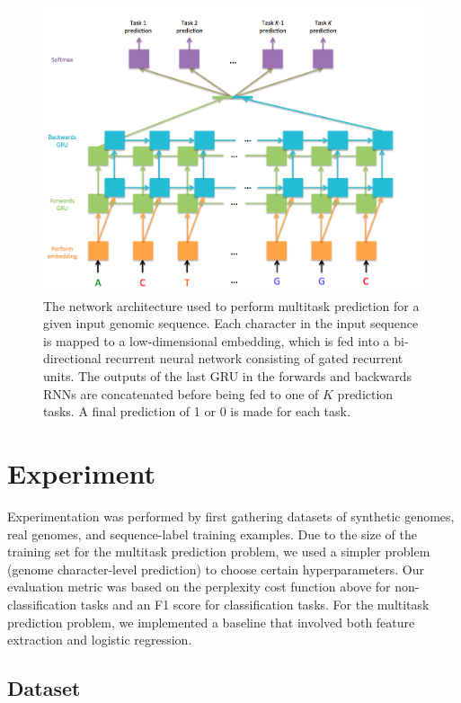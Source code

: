\documentclass{article} %
\begin{document}
\begin{figure}[!htb]
	\caption{The network architecture used to perform multitask prediction for a given input genomic sequence. Each character in the input sequence is mapped to a low-dimensional embedding, which is fed into a bi-directional recurrent neural network consisting of gated recurrent units. The outputs of the last GRU in the forwards and backwards RNNs are concatenated before being fed to one of $K$ prediction tasks. A final prediction of 1 or 0 is made for each task.}
	\centering
	\includegraphics[scale=0.4]{Figure1}
\end{figure}

\section{Experiment}

Experimentation was performed by first gathering datasets of synthetic genomes, real genomes, and sequence-label training examples. Due to the size of the training set for the multitask prediction problem, we used a simpler problem (genome character-level prediction) to choose certain hyperparameters. Our evaluation metric was based on the perplexity cost function above for non-classification tasks and an F1 score for classification tasks. For the multitask prediction problem, we implemented a baseline that involved both feature extraction and logistic regression.

\subsection{Dataset}
\end{document}
